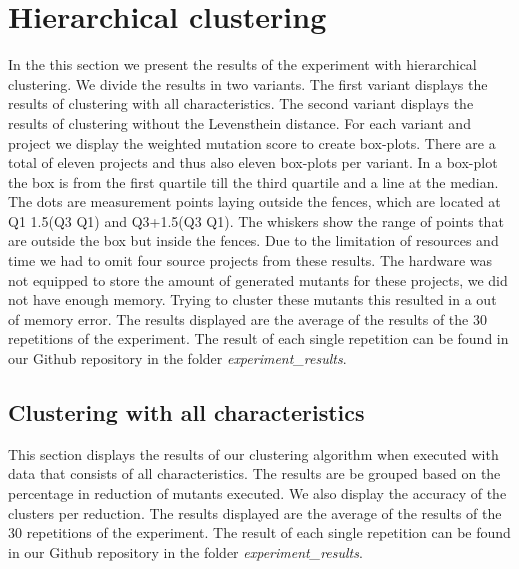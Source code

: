 \documentclass[../../main]{subfiles}
\begin{document}
\section{Hierarchical clustering}
\label{ch:results_rq1}
In the this section we present the results of the experiment with hierarchical clustering.
We divide the results in two variants. 
The first variant displays the results of clustering with all characteristics.
The second variant displays the results of clustering without the Levensthein distance.
\newline
For each variant and project we display the weighted mutation score to create box-plots.
There are a total of eleven projects and thus also eleven box-plots per variant.
In a box-plot the box is from the first quartile till the third quartile and a line at the median. 
The dots are measurement points laying outside the fences, which are located at Q1  1.5(Q3  Q1) and Q3+1.5(Q3  Q1). 
The whiskers show the range of points that are outside the box but inside the fences.
\newline
Due to the limitation of resources and time we had to omit four source projects from these results. 
The hardware was not equipped to store the amount of generated mutants for these projects, we did not have enough memory.
Trying to cluster these mutants this resulted in a out of memory error.
\newline
The results displayed are the average of the results of the 30 repetitions of the experiment.
The result of each single repetition can be found in our Github repository in the folder \textit{experiment{_}results}\cite{rbasarat-repo}.

\subsection{Clustering with all characteristics}
This section displays the results of our clustering algorithm when executed with data that consists of all characteristics.
The results are be grouped based on the percentage in reduction of mutants executed.
We also display the accuracy of the clusters per reduction.
The results displayed are the average of the results of the 30 repetitions of the experiment.
The result of each single repetition can be found in our Github repository in the folder \textit{experiment{_}results}\cite{rbasarat-repo}.
\end{document}
